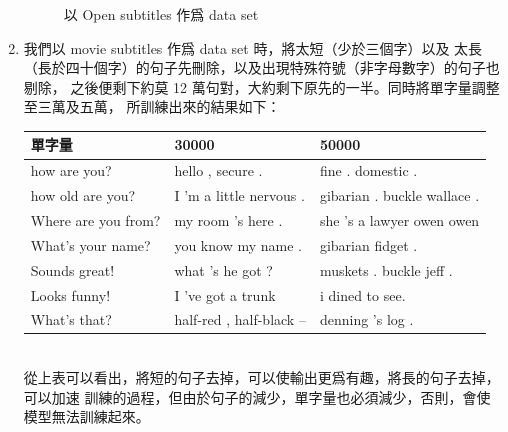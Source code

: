 \documentclass[12pt, a4paper]{article}
\theoremstyle{mystyle}	%
\begin{document}
\begin{enumerate}
\begin{figure}[!htb]
    \caption{以 Open subtitles 作爲 data set}
    \label{fig:open-per}
   \endminipage
  \end{figure}
\item 我們以 movie subtitles 作爲 data set 時，將太短（少於三個字）以及
  太長（長於四十個字）的句子先刪除，以及出現特殊符號（非字母數字）的句子也剔除，
  之後便剩下約莫 12 萬句對，大約剩下原先的一半。同時將單字量調整至三萬及五萬，
  所訓練出來的結果如下：\\
  \begin{tabular}{lll}
    \hline
    單字量              & 30000                    & 50000 \\
    \hline
    \hline
    how are you?        & hello , secure .         & fine . domestic .\\
    \hline
    how old are you?    & I 'm a little nervous .  & gibarian . buckle wallace .\\
    \hline
    Where are you from? & my room 's here .        & she 's a lawyer owen owen \\
    \hline
    What's your name?   & you know my name .       & gibarian fidget .\\
    \hline
    Sounds great!       & what 's he got ?         & muskets . buckle jeff .\\
    \hline
    Looks funny!        & I 've got a trunk        & i dined to see.\\
    \hline
    What's that?        & half-red , half-black -- & denning 's log .\\
    \hline
  \end{tabular} \\
  從上表可以看出，將短的句子去掉，可以使輸出更爲有趣，將長的句子去掉，可以加速
  訓練的過程，但由於句子的減少，單字量也必須減少，否則，會使模型無法訓練起來。
\end{enumerate}
\end{document}

